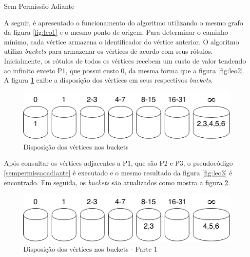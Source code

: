 \begin{algorithm}[h!]
\caption{Sem Permissão Adiante}
\label{sempermissaoadiante}
\end{algorithm}
\FloatBarrier

A seguir, é apresentado o funcionamento do algoritmo utilizando o mesmo grafo da figura \ref{fig:leo1}
e o mesmo ponto de origem. Para determinar o caminho mínimo, cada vértice armazena o identificador do vértice anterior.
O algoritmo utiliza \textit{buckets} para armazenar os vértices de acordo com seus rótulos.
Inicialmente, os rótulos de todos os vértices recebem um custo de valor tendendo ao infinito exceto P1,
que possui custo 0, da mesma forma que a figura \ref{fig:leo2}. A figura \ref{fig:buckets} exibe a disposição dos vértices em seus
respectivos \textit{buckets}.

\begin{figure}[htbp]
\centering
 \includegraphics[width=.50\textwidth]{figuras/buckets.png}
\caption{Disposição dos vértices nos buckets}
\label{fig:buckets}
\end{figure}
\FloatBarrier

Após consultar os vértices adjacentes a P1, que são P2 e P3, o pseudocódigo \ref{sempermissaoadiante}
é executado e o mesmo resultado da figura \ref{fig:leo3} é encontrado. Em seguida, os \textit{buckets} são atualizados
como mostra a figura \ref{fig:buckets1}.

\begin{figure}[htbp]
\centering
 \includegraphics[width=.50\textwidth]{figuras/buckets1.png}
\caption{Disposição dos vértices nos buckets - Parte 1}
\label{fig:buckets1}
\end{figure}
\FloatBarrier

